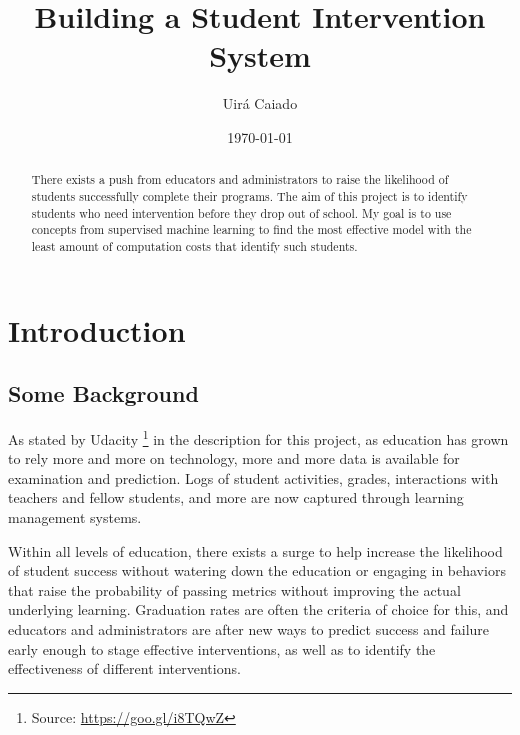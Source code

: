 \documentclass[a4paper]{article}
\title{Building a Student Intervention System}
\author{Uirá Caiado}
\date{\today}
\begin{document}
\maketitle

\begin{abstract}
There exists a push from educators and administrators to raise the likelihood of students successfully complete their programs. The aim of this project is to identify students who need intervention before they drop out of school. My goal is to use concepts from supervised machine learning to find the most effective model with the least amount of computation costs that identify such students.
\end{abstract}


\section{Introduction}
\label{sec:introduction}


\subsection{Some Background}
As stated by Udacity \footnote{Source: \url{https://goo.gl/i8TQwZ}} in the description for this project, as education has grown to rely more and more on technology, more and more data is available for examination and prediction. Logs of student activities, grades, interactions with teachers and fellow students, and more are now captured through learning management systems.

Within all levels of education, there exists a surge to help increase the likelihood of student success without watering down the education or engaging in behaviors that raise the probability of passing metrics without improving the actual underlying learning. Graduation rates are often the criteria of choice for this, and educators and administrators are after new ways to predict success and failure early enough to stage effective interventions, as well as to identify the effectiveness of different interventions.
\end{document}
